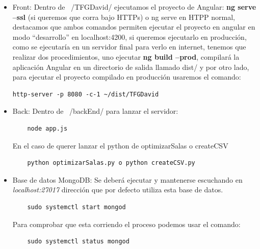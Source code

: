 \documentclass[a4paper, 12pt]{book}
\begin{document}
\begin{itemize}
  \item Front: Dentro de ~/TFGDavid/ ejecutamos el proyecto de Angular:
	\textbf{ng serve --ssl} (si queremos que corra bajo HTTPs) o ng serve en HTPP normal, destacamos que ambos comandos permiten ejecutar el proyecto en angular en modo ``desarrollo'' en localhost:4200, si queremos ejecutarlo en producción, como se ejecutaría en un servidor final para verlo en internet, tenemos que realizar dos procedimientos, uno ejecutar \textbf{ng build --prod}, compilará la aplicación Angular en un directorio de salida llamado dist/ y por otro lado, para ejecutar el proyecto compilado en producción usaremos el comando:
\begin{verbatim}
http-server -p 8080 -c-1 ~/dist/TFGDavid
\end{verbatim}

	
\item Back: Dentro de ~/backEnd/ para lanzar el servidor: 

	\begin{verbatim}
	node app.js
	\end{verbatim}

En el caso de querer lanzar el python de optimizarSalas o createCSV
	\begin{verbatim}
	python optimizarSalas.py o python createCSV.py
	\end{verbatim}
	
\item Base de datos MongoDB: Se deberá ejecutar y mantenerse escuchando en \textit{localhost:27017} dirección que por defecto utiliza esta base de datos.

	\begin{verbatim}
	sudo systemctl start mongod
	\end{verbatim}

Para comprobar que esta corriendo el proceso podemos usar el comando:

	\begin{verbatim}
	sudo systemctl status mongod
	\end{verbatim}

\end{itemize}

\cleardoublepage

\nocite{*}

  

\end{document}
